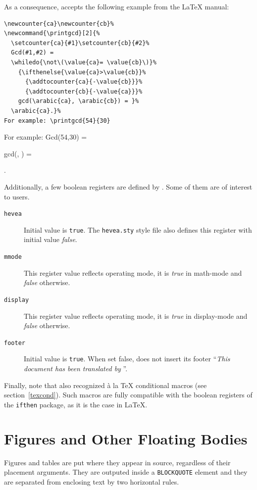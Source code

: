 As a consequence, \hevea{} accepts the following example from the
\LaTeX{} manual:
\begin{verbatim}
\newcounter{ca}\newcounter{cb}%
\newcommand{\printgcd}[2]{%
  \setcounter{ca}{#1}\setcounter{cb}{#2}%
  Gcd(#1,#2) =
  \whiledo{\not\(\value{ca}= \value{cb}\)}%
    {\ifthenelse{\value{ca}>\value{cb}}%
      {\addtocounter{ca}{-\value{cb}}}%
      {\addtocounter{cb}{-\value{ca}}}%
    gcd(\arabic{ca}, \arabic{cb}) = }%
  \arabic{ca}.}%
For example: \printgcd{54}{30}
\end{verbatim}
%
\newcommand{\printgcd}[2]{%
  \setcounter{ca}{#1}\setcounter{cb}{#2}%
  Gcd(#1,#2) =
  \whiledo{\not\(\value{ca}= \value{cb}\)}%
    {\ifthenelse{\value{ca}>\value{cb}}%
      {\addtocounter{ca}{-\value{cb}}}%
      {\addtocounter{cb}{-\value{ca}}}%
    gcd(\arabic{ca}, ) = }%
  .}%
For example: \printgcd{54}{30}

Additionally, a few boolean registers are defined by \hevea{}.
Some of them are of interest to users.
\begin{description}
\item[\texttt{hevea}] Initial value is \texttt{true}.
The \texttt{hevea.sty} style file also defines this register with
initial value \textit{false}.
\item[\texttt{mmode}] This register value reflects \hevea{} operating
mode, it is \textit{true} in math-mode and \textit{false} otherwise.
\item[\texttt{display}]  This register value reflects \hevea{} operating
mode, it is \textit{true} in display-mode and \textit{false} otherwise.
\item[\texttt{footer}] Initial value is  \texttt{true}.
When set false, \hevea{} does not insert its footer ``\emph{This
document has been translated by \hevea}''.

\end{description}

Finally, note that \hevea{} also recognized \`a la \TeX{} conditional
macros (see section~\ref{texcond}). Such macros are fully compatible
with the boolean registers of the \texttt{ifthen} package, as it is
the case in \LaTeX.


\section{Figures and Other Floating Bodies}

Figures and tables are put where they appear in source, regardless of
their placement arguments.
They are outputed  inside a \verb+BLOCKQUOTE+ element and they are
separated from enclosing text by two
horizontal rules.

